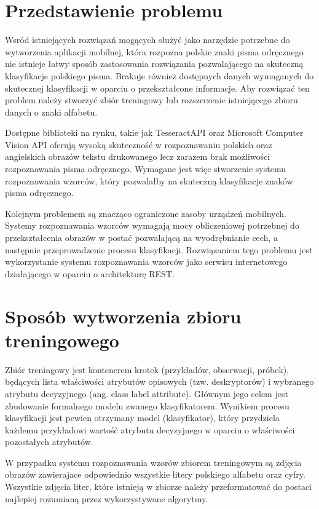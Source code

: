 \documentclass[brudnopis]{xmgr}
\begin{document}
\section{Przedstawienie problemu}

Wsród istniejących rozwiązań mogących służyć jako narzędzie potrzebne do wytworzenia aplikacji mobilnej, która rozpozna polskie znaki pisma odręcznego nie istnieje łatwy sposób zastosowania rozwiązania pozwalającego na skuteczną klasyfikacje polskiego pisma. Brakuje również dostępnych danych wymaganych do skutecznej klasyfikacji w oparciu o przekształcone informacje. Aby rozwiązać ten problem należy stworzyć zbiór treningowy lub rozszerzenie istniejącego zbioru danych o znaki alfabetu.

Dostępne biblioteki na rynku, takie jak TesseractAPI\cite{10} oraz Microsoft Computer Vision API\cite{9} oferują wysoką skuteczność w rozpoznawaniu polskich oraz angielskich obrazów tekstu drukowanego lecz zarazem brak możliwości rozpoznawania pisma odręcznego. Wymagane jest więc stworzenie systemu rozpoznawania wzorców, który pozwalałby na skuteczną klasyfikacje znaków pisma odręcznego.

Kolejnym problemem są znacząco ograniczone zasoby urządzeń mobilnych. Systemy rozpoznawania wzorców wymagają mocy obliczeniowej potrzebnej do przekształcenia obrazów w postać pozwalającą na wyodrębnianie cech, a następnie przeprowadzenie procesu klasyfikacji. Rozwiązaniem tego problemu jest wykorzystanie systemu rozpoznawania wzorców jako serwisu internetowego działającego w oparciu o architekturę REST\cite{5}.

\section{Sposób wytworzenia zbioru treningowego}

Zbiór treningowy\cite{19} jest kontenerem krotek (przykładów, obserwacji, próbek), będących lista właściwości atrybutów opisowych (tzw. deskryptorów) i wybranego atrybutu decyzyjnego (ang. class label attribute). Głównym jego celem jest zbudowanie formalnego modelu zwanego klasyfikatorem. Wynikiem procesu klasyfikacji jest pewien otrzymany model (klasyfikator), który przydziela każdemu przykładowi wartość atrybutu decyzyjnego w oparciu o właściwości pozostałych atrybutów.

W przypadku systemu rozpoznawania wzorów zbiorem treningowym są zdjęcia obrazów zawierajace odpowiednio wszystkie litery polskiego alfabetu oraz cyfry. Wszystkie zdjęcia liter, które istnieją w zbiorze należy przeformatować do postaci najlepiej rozumianą przez wykorzystywane algorytmy.
\end{document}
